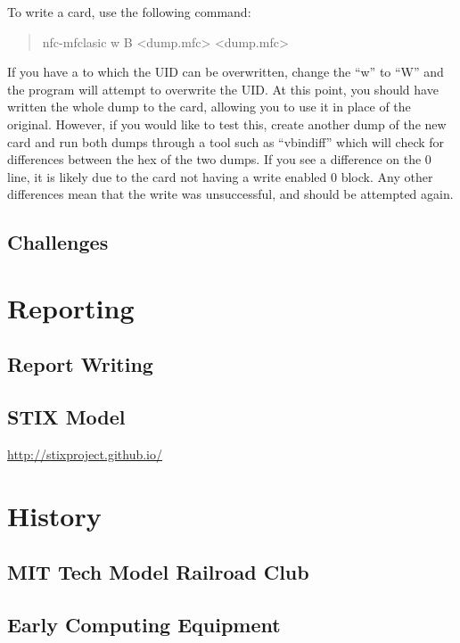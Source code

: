 \documentclass[a4paper,11pt]{report}
\begin{document}
			To write a card, use the following command:
			\begin{quote}
				nfc-mfclasic w B <dump.mfc> <dump.mfc> 
			\end{quote}
			If you have a to which the UID can be overwritten, change the ``w'' to ``W'' and the program will attempt to overwrite the UID. 
			At this point, you should have written the whole dump to the card, allowing you to use it in place of the original. 
			However, if you would like to test this, create another dump of the new card and run both dumps through a tool such as ``vbindiff'' which will check for differences between the hex of the two dumps. 
			If you see a difference on the 0 line, it is likely due to the card not having a write enabled 0 block. 
			Any other differences mean that the write was unsuccessful, and should be attempted again. 
	\section{Challenges}
\chapter{Reporting}
	\label{ch:Reporting}
	\section{Report Writing}
	\section{STIX Model}
		\url{http://stixproject.github.io/}
\newpage
\chapter{History}
	\label{ch:History}
	\section{MIT Tech Model Railroad Club}
	\section{Early Computing Equipment}
\appendix
	\label{ch:Appendix}
	\listoftables
	\listoffigures
	 \renewcommand{\figurename}{Code Example}
	 	
	
	
\end{document}
